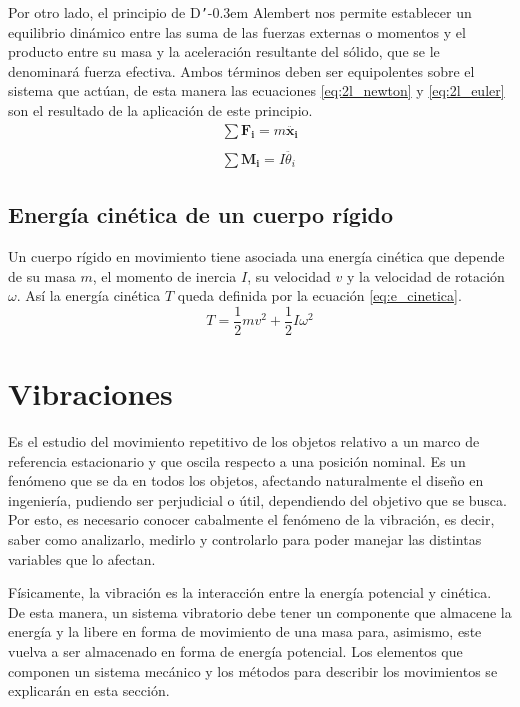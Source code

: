 Por otro lado, el principio de D\texttt{'}\kern-0.3em Alembert nos permite establecer un equilibrio dinámico entre las suma de las fuerzas externas o momentos y el producto entre su masa y la aceleración resultante del sólido, que se le denominará fuerza efectiva. Ambos términos deben ser equipolentes sobre el sistema que actúan, de esta manera las ecuaciones \ref{eq:2l_newton} y \ref{eq:2l_euler} son el resultado de la aplicación de este principio.
\begin{gather}
	\sum \mathbf{F_i} = m\mathbf{\ddot{x_i}} \label{eq:2l_newton}\\
	\nonumber \\
	\sum \mathbf{M_i} = I\ddot{\theta_i} \label{eq:2l_euler}
\end{gather}

\subsection{Energía cinética de un cuerpo rígido}
Un cuerpo rígido en movimiento tiene asociada una energía cinética que depende de su masa $m$, el momento de inercia $I$, su velocidad $v$ y la velocidad de rotación $\omega$. Así la energía cinética $T$ queda definida por la ecuación \ref{eq:e_cinetica}.
\begin{equation}\label{eq:e_cinetica}
	T = \frac{1}{2}mv^2 + \frac{1}{2}I\omega^2 
\end{equation}


\section{Vibraciones}
Es el estudio del movimiento repetitivo de los objetos relativo a un marco de referencia estacionario y que oscila respecto a una posición nominal. Es un fenómeno que se da en todos los objetos, afectando naturalmente el diseño en ingeniería, pudiendo ser perjudicial o útil, dependiendo del objetivo que se busca. Por esto, es necesario conocer cabalmente el fenómeno de la vibración, es decir, saber como analizarlo, medirlo y controlarlo para poder manejar las distintas variables que lo afectan.

Físicamente, la vibración es la interacción entre la energía potencial y cinética. De esta manera, un sistema vibratorio debe tener un componente que almacene la energía y la libere en forma de movimiento de una masa para, asimismo, este vuelva a ser almacenado en forma de energía potencial. Los elementos que componen un sistema mecánico y los métodos para describir los movimientos se explicarán en esta sección.


